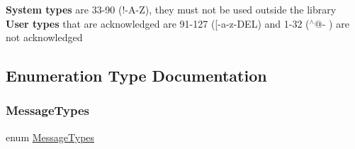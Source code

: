 {\bfseries System types} are 33-\/90 (\textquotesingle{}!\textquotesingle{}-\/A\textquotesingle{}-\/\textquotesingle{}Z\textquotesingle{}), they must not be used outside the library~\newline
 {\bfseries User types} that are acknowledged are 91-\/127 (\textquotesingle{}\mbox{[}\textquotesingle{}-\/\textquotesingle{}a\textquotesingle{}-\/\textquotesingle{}z\textquotesingle{}-\/\textquotesingle{}D\+EL\textquotesingle{}) and 1-\/32 (\textquotesingle{}$^\wedge$@\textquotesingle{}-\/\textquotesingle{} \textquotesingle{}) are not acknowledged~\newline
 

\subsection{Enumeration Type Documentation}
\mbox{\label{group__TOONETWORKING__RESERVED__TYPES_ga8a71ab4395ca4331fc50559eb1127e76}} 
\subsubsection{\texorpdfstring{Message\+Types}{MessageTypes}}
{\footnotesize\ttfamily enum \hyperlink{group__TOONETWORKING__RESERVED__TYPES_ga8a71ab4395ca4331fc50559eb1127e76}{Message\+Types}}

